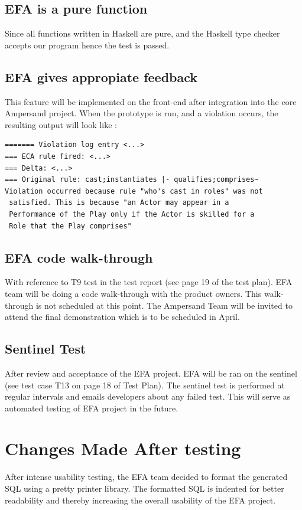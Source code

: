 \documentclass[12pt, svgnames]{article}
\begin{document}
\subsection{EFA is a pure function}
Since all functions written in
Haskell are pure, and the  Haskell type checker accepts our program hence the test is passed.

\subsection{EFA gives appropiate feedback}
This feature will be implemented on the front-end after integration into the core Ampersand project. When the prototype is run, and a violation occurs, the resulting output will look like :

\begin{verbatim}
======= Violation log entry <...>
=== ECA rule fired: <...> 
=== Delta: <...>
=== Original rule: cast;instantiates |- qualifies;comprises~
Violation occurred because rule "who's cast in roles" was not 
 satisfied. This is because "an Actor may appear in a 
 Performance of the Play only if the Actor is skilled for a 
 Role that the Play comprises"
\end{verbatim}

\subsection{EFA code walk-through}
With reference to T9 test in the test report (see page 19 of the test plan). EFA team will be doing a code walk-through with the product owners. This walk-through is not scheduled at this point. The Ampersand Team will be invited to attend the final demonstration which is to be scheduled in April.

\subsection{Sentinel Test}
After review and acceptance of the EFA project. EFA will be ran on the sentinel (see test case T13 on page 18 of Test Plan). The sentinel test is performed at regular intervals and emails developers about any failed test. This will serve as automated testing of EFA project in the future.

\section{Changes Made After testing}
After intense usability testing, the EFA team decided to format the generated SQL using a pretty printer library. The formatted SQL is indented for better readability and thereby increasing the overall usability of the EFA project.



\end{document}
